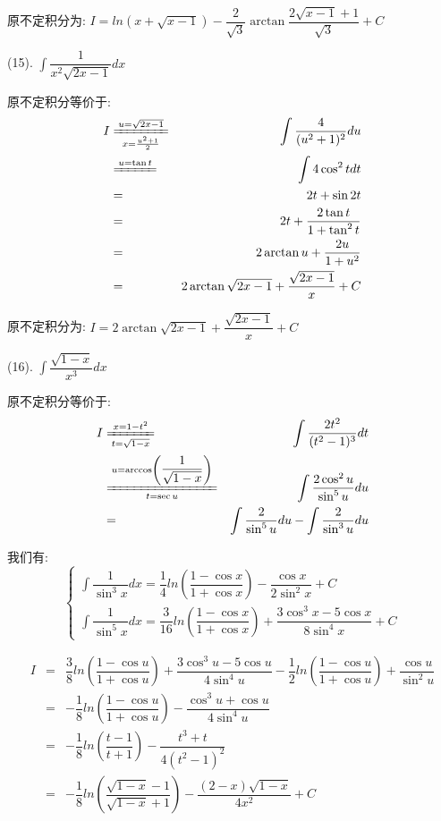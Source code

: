 \begin{anymark}[积分训练]
\begin{solution}
		原不定积分为:  $I=ln(x+\sqrt{x-1})-\dfrac{2}{\sqrt{3}}\arctan\dfrac{2\sqrt{x-1}+1}{\sqrt{3}}+C$
	\end{solution}
	(15). $\int \dfrac{1}{x^2\sqrt{2x-1}}dx$
	\begin{solution}
		
		原不定积分等价于:  
		\begin{eqnarray*}
			I&\xlongequal[x=\frac{u^2+1}{2}]{u=\sqrt{2x-1}}&\int \dfrac{4}{(u^2+1)^2}du\\
			&\xlongequal{u=\tan t}&\int 4\cos^2 tdt\\
			&=&2t+\sin 2t\\
			&=&2t+\dfrac{2\tan t}{1+\tan^2t}\\
			&=&2\arctan u+\dfrac{2u}{1+u^2}\\
			&=&2\arctan\sqrt{2x-1}+\dfrac{\sqrt{2x-1}}{x}+C
		\end{eqnarray*}
		
		原不定积分为:  $I=2\arctan\sqrt{2x-1}+\dfrac{\sqrt{2x-1}}{x}+C$
	\end{solution}
	(16). $\int \dfrac{\sqrt{1-x}}{x^3}dx$
	\begin{solution}
		
		原不定积分等价于:  
		\begin{eqnarray*}
			I&\xlongequal[t=\sqrt{1-x}]{x=1-t^2}&\int \dfrac{2t^2}{(t^2-1)^3}dt\\
			&\xlongequal[t=\sec u]{u=\arccos\left(\dfrac{1}{\sqrt{1-x}}\right)}&\int \dfrac{2\cos^2u}{\sin^5 u}du\\
			&=&\int \dfrac{2}{\sin^5 u}du-\int \dfrac{2}{\sin^3 u}du	
		\end{eqnarray*}
		
		我们有:
		$$\left\lbrace
		\begin{array}{l}
			\int \dfrac{1}{\sin^3 x}dx=\dfrac{1}{4}ln\left(\dfrac{1-\cos x}{1+\cos x} \right)-\dfrac{\cos x}{2\sin^2 x}+C\\
			\int \dfrac{1}{\sin^5 x}dx=\dfrac{3}{16}ln\left(\dfrac{1-\cos x}{1+\cos x} \right)+\dfrac{3\cos^3 x-5\cos x}{8\sin^4x}+C
		\end{array}
		\right. $$
		
		\begin{eqnarray*}
			I&=&\dfrac{3}{8}ln\left(\dfrac{1-\cos u}{1+\cos u} \right)+\dfrac{3\cos^3 u-5\cos u}{4\sin^4u}-\dfrac{1}{2}ln\left(\dfrac{1-\cos u}{1+\cos u} \right)+\dfrac{\cos u}{\sin^2 u}\\
			&=&-\dfrac{1}{8}ln\left(\dfrac{1-\cos u}{1+\cos u} \right)-\dfrac{\cos^3 u+\cos u}{4\sin^4 u}\\
			&=&-\dfrac{1}{8}ln\left(\dfrac{t-1}{t+1} \right)-\dfrac{t^3+t}{4(t^2-1)^2}\\
			&=&-\dfrac{1}{8}ln\left(\dfrac{\sqrt{1-x}-1}{\sqrt{1-x}+1} \right)-\dfrac{(2-x)\sqrt{1-x}}{4x^2}+C
		\end{eqnarray*}
	

\end{solution}
\end{anymark}
